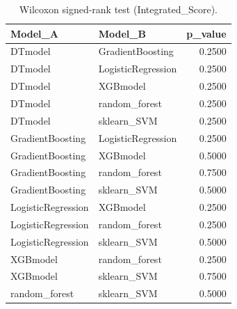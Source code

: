 \begin{table}[t]
\centering
\begin{tabular}{llr}
\toprule
Model_A & Model_B & p_value \\
\midrule
DTmodel & GradientBoosting & 0.2500 \\
DTmodel & LogisticRegression & 0.2500 \\
DTmodel & XGBmodel & 0.2500 \\
DTmodel & random_forest & 0.2500 \\
DTmodel & sklearn_SVM & 0.2500 \\
GradientBoosting & LogisticRegression & 0.2500 \\
GradientBoosting & XGBmodel & 0.5000 \\
GradientBoosting & random_forest & 0.7500 \\
GradientBoosting & sklearn_SVM & 0.5000 \\
LogisticRegression & XGBmodel & 0.2500 \\
LogisticRegression & random_forest & 0.2500 \\
LogisticRegression & sklearn_SVM & 0.5000 \\
XGBmodel & random_forest & 0.2500 \\
XGBmodel & sklearn_SVM & 0.7500 \\
random_forest & sklearn_SVM & 0.5000 \\
\bottomrule
\end{tabular}
\caption{Wilcoxon signed-rank test (Integrated_Score).}
\label{tab:wilcoxon_Integrated_Score}
\end{table}